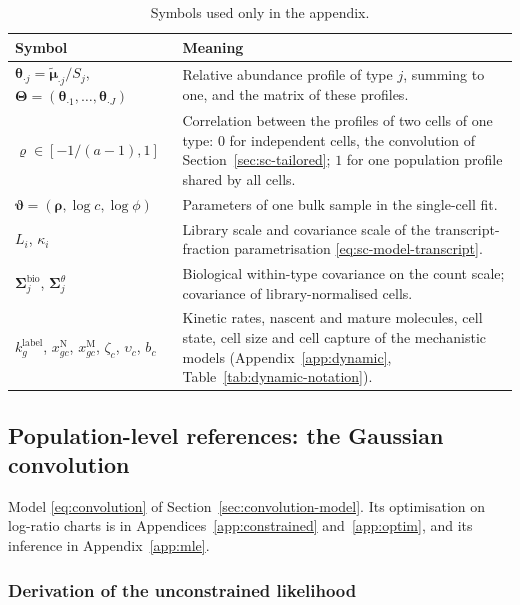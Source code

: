 \begin{table}[ht]
  \centering
  \caption{Symbols used only in the appendix.}
  \label{tab:notation-appendix}
  \begin{tabularx}{\textwidth}{@{}lY@{}}
    \toprule
    Symbol & Meaning \\
    \midrule
    \(\boldsymbol{\theta}_{\cdot j}=\tilde{\boldsymbol{\mu}}_{\cdot j}/S_{j}\), \(\boldsymbol{\Theta}=(\boldsymbol{\theta}_{\cdot 1},\ldots,\boldsymbol{\theta}_{\cdot J})\) &
      Relative abundance profile of type \(j\), summing to one, and the matrix of these profiles. \\
    \(\varrho\in[-1/(a-1),1]\) &
      Correlation between the profiles of two cells of one type: \(0\) for independent cells, the convolution
      of Section~\ref{sec:sc-tailored}; \(1\) for one population profile shared by all cells. \\
    \(\boldsymbol{\vartheta}=(\boldsymbol{\rho},\log c,\log\phi)\) &
      Parameters of one bulk sample in the single-cell fit. \\
    \(L_{i}\), \(\kappa_{i}\) &
      Library scale and covariance scale of the transcript-fraction parametrisation
      \eqref{eq:sc-model-transcript}. \\
    \(\boldsymbol{\Sigma}^{\mathrm{bio}}_{j}\), \(\boldsymbol{\Sigma}^{\theta}_{j}\) &
      Biological within-type covariance on the count scale; covariance of library-normalised cells. \\
    \(k^{\mathrm{label}}_{g}\), \(x^{\mathrm{N}}_{gc}\), \(x^{\mathrm{M}}_{gc}\), \(\zeta_{c}\), \(\upsilon_{c}\), \(b_{c}\) &
      Kinetic rates, nascent and mature molecules, cell state, cell size and cell capture of the mechanistic models
      (Appendix~\ref{app:dynamic}, Table~\ref{tab:dynamic-notation}). \\
    \bottomrule
  \end{tabularx}
\end{table}

\subsection{Population-level references: the Gaussian convolution}
\label{app:conv}

Model \eqref{eq:convolution} of Section~\ref{sec:convolution-model}. Its optimisation on log-ratio charts is in
Appendices~\ref{app:constrained} and~\ref{app:optim}, and its inference in Appendix~\ref{app:mle}.

\subsubsection{Derivation of the unconstrained likelihood}
\label{app:derivation}

